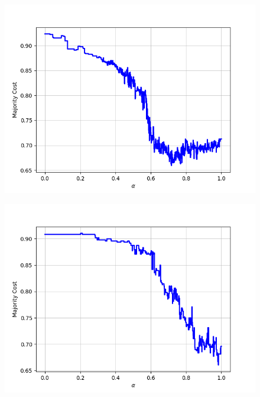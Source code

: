 \begin{figure}[H]
\begin{minipage}{.24\textwidth}
  {\includegraphics[width=\linewidth]{plots/omniglot-intra-sc/Futurama}}
\end{minipage}
\begin{minipage}{.24\textwidth}
  \centering
  {\includegraphics[width=\linewidth]{plots/omniglot-intra-sc/Grantha}}
\end{minipage}
\begin{minipage}{.24\textwidth}
  \centering

\end{minipage}
\end{figure}
